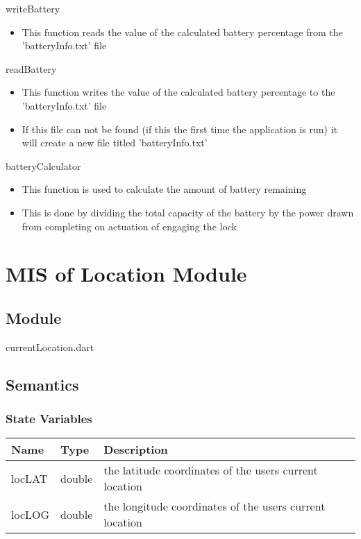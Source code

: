 \documentclass[12pt, titlepage]{article}
\begin{document}
\noindent writeBattery
\begin{itemize}
\item This function reads the value of the calculated battery percentage from the 'batteryInfo.txt' file
\end{itemize}

\noindent readBattery
\begin{itemize}
\item This function writes the value of the calculated battery percentage to the 'batteryInfo.txt' file
\item If this file can not be found (if this the first time the application is run) it will create a new file titled 'batteryInfo.txt'
\end{itemize}

\noindent batteryCalculator
\begin{itemize}
\item This function is used to calculate the amount of battery remaining
\item This is done by dividing the total capacity of the battery by the power drawn from completing on actuation of engaging the lock
\end{itemize}


\section{MIS of Location Module} \label{mHD}

\subsection{Module}
currentLocation.dart

\subsection{Semantics}

\subsubsection{State Variables}

\begin{center}
\begin{tabular}{p{4cm} p{4cm} p{6cm}}
\hline
\textbf{Name} & \textbf{Type} & \textbf{Description} \\
\hline
locLAT & double & the latitude coordinates of the users current location \\
locLOG & double & the longitude coordinates of the users current location \\
\hline
\end{tabular}
\end{center}
\end{document}
